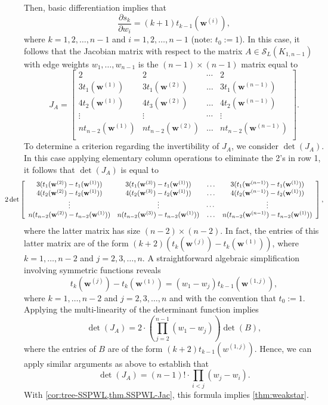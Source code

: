 \documentclass{article}
\theoremstyle{definition}
\newcommand{\bw}{\mathbf{w}}
\newcommand{\mptn}{\mathcal{S}}
\begin{document}
Then, basic differentiation implies that 
\[ 
    \frac{\partial s_k}{\partial w_i} = (k+1) t_{k-1}(\bw^{(i)}),
\] 
where $k=1,2,\ldots,n-1$ and $i=1,2,\ldots,n-1$ (note: $t_0 :=1$). In this case, it follows that the Jacobian matrix with respect to the matrix $A \in \mptn_L(K_{1,n-1})$ with edge weights $w_1, \dots, w_{n-1}$ is the $(n-1)\times (n-1)$ matrix equal to
\[ J_{A}= \left[\begin{array}{cccc}
2 & 2 & \cdots & 2 \\
3 t_{1}(\bw^{(1)}) & 3 t_{1}(\bw^{(2)}) & \ldots & 3 t_{1}(\bw^{(n-1)}) \\
4 t_{2}(\bw^{(1)}) & 4 t_{3}(\bw^{(2)}) & \ldots & 4 t_{2}(\bw^{(n-1)}) \\
\vdots & \vdots & \cdots & \vdots \\
n t_{n-2}(\bw^{(1)}) & n t_{n-2}(\bw^{(2)}) & \ldots & n t_{n-2}(\bw^{(n-1)}) \\
\end{array} \right]. \]
To determine a criterion regarding the invertibility of $J_A$, we consider $\det (J_A)$. In this case applying elementary column operations to eliminate the 2's in row 1, it follows that $\det(J_A)$ is equal to 
\small{\[\hspace{-1cm} 2 \det \left[\begin{array}{cccc}
3(t_{1}(\bw^{(2)})-t_{1}(\bw^{(1)})) & 3(t_{1}(\bw^{(3)})-t_{1}(\bw^{(1)})) & \ldots & 3(t_{1}(\bw^{(n-1)})-t_{1}(\bw^{(1)})) \\
4(t_{2}(\bw^{(2)})-t_{2}(\bw^{(1)})) & 4(t_{2}(\bw^{(3)})-t_{2}(\bw^{(1)})) & \ldots & 4(t_{2}(\bw^{(n-1)})-t_{2}(\bw^{(1)})) \\
\vdots & \vdots & \cdots & \vdots \\
n(t_{n-2}(\bw^{(2)})-t_{n-2}(\bw^{(1)})) & n(t_{n-2}(\bw^{(3)})-t_{n-2}(\bw^{(1)})) & \ldots & n(t_{n-2}(\bw^{(n-1)})-t_{n-2}(\bw^{(1)})) \\
\end{array} \right], \]} where the latter matrix has size $(n-2)\times (n-2)$. In fact, the entries of this latter matrix are of the form 
$(k+2)(t_{k}(\bw^{(j)})-t_{k}(\bw^{(1)}))$, where $k=1,\ldots, n-2$ and $j=2,3,\ldots, n$. A straightforward algebraic simplification involving symmetric functions reveals
\[ t_{k}(\bw^{(j)})-t_{k}(\bw^{(1)}) = (w_1-w_j)t_{k-1}(\bw^{(1,j)}),\] where 
$k=1,\ldots, n-2$ and $j=2,3,\ldots, n$ and with the convention that $t_0 :=1$.
Applying the multi-linearity of the determinant function implies
\[ \det(J_A) = 2 \cdot 
\left(\prod_{j=2}^{n-1} (w_1-w_j)\right) \det(B),\] where the entries of $B$ are of the form $(k+2)t_{k-1}(w^{(1,j)})$. Hence, we can apply similar arguments as above to establish that 
\[ \det(J_A) = (n-1)! \cdot \prod_{i<j} (w_j-w_i).\]
With \cref{cor:tree-SSPWL,thm.SSPWL-Jac}, this formula implies \cref{thm:weakstar}.
\end{document}
